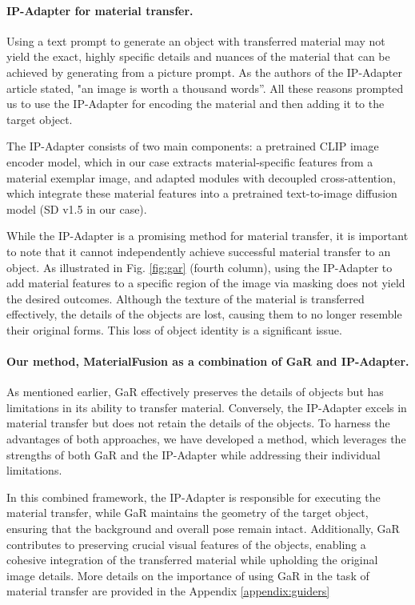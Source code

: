 \paragraph{IP-Adapter for material transfer.} Using a text prompt to generate an object with transferred material may not yield the exact, highly specific details and nuances of the material that can be achieved by generating from a picture prompt. As the authors of the IP-Adapter article stated, "an image is worth a thousand words”. All these reasons prompted us to use the IP-Adapter for encoding the material and then adding it to the target object. 

The IP-Adapter consists of two main components: a pretrained CLIP \cite{radford2021learning} image encoder model, which in our case extracts material-specific features from a material exemplar image, and adapted modules with decoupled cross-attention, which integrate these material features into a pretrained text-to-image diffusion model (SD v1.5 in our case).

While the IP-Adapter is a promising method for material transfer, it is important to note that it cannot independently achieve successful material transfer to an object. As illustrated in Fig. \ref{fig:gar} (fourth column), using the IP-Adapter to add material features to a specific region of the image via masking does not yield the desired outcomes. Although the texture of the material is transferred effectively, the details of the objects are lost, causing them to no longer resemble their original forms. This loss of object identity is a significant issue.


\paragraph{Our method, MaterialFusion as a combination of GaR and IP-Adapter.} As mentioned earlier, GaR effectively preserves the details of objects but has limitations in its ability to transfer material. Conversely, the IP-Adapter excels in material transfer but does not retain the details of the objects. To harness the advantages of both approaches, we have developed a method, which leverages the strengths of both GaR and the IP-Adapter while addressing their individual limitations.

In this combined framework, the IP-Adapter is responsible for executing the material transfer, while GaR maintains the geometry of the target object, ensuring that the background and overall pose remain intact. Additionally, GaR contributes to preserving crucial visual features of the objects, enabling a cohesive integration of the transferred material while upholding the original image details. More details on the importance of using GaR in the task of material transfer are provided in the Appendix \ref{appendix:guiders}

